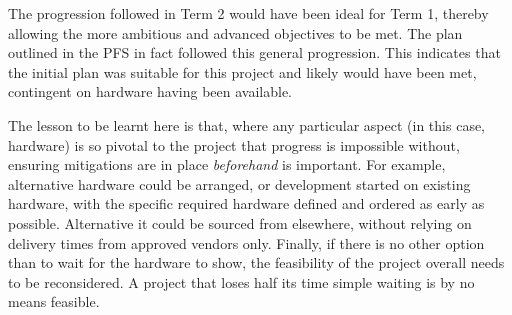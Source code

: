\documentclass[11pt]{article}
\begin{document}
The progression followed in Term 2 would have been ideal for Term 1, thereby allowing the more 
ambitious and advanced objectives to be met. The plan outlined in the PFS in fact followed this general progression.
This indicates that the initial plan was suitable for this project and likely would have been met, contingent 
on hardware having been available. 

The lesson to be learnt here is that, where any particular aspect (in this case, hardware) is 
so pivotal to the project that progress is impossible without, ensuring mitigations are in place 
\textit{beforehand} is important. For example, alternative hardware could be arranged, or 
development started on existing hardware, with the specific required hardware defined and ordered 
as early as possible. Alternative it could be sourced from elsewhere, without relying on delivery times from 
approved vendors only. 
Finally, if there is no other option than to wait for the hardware to show, the feasibility of the 
project overall needs to be reconsidered. A project that loses half its time simple waiting 
is by no means feasible. 

    
    
    
    
\end{document}
